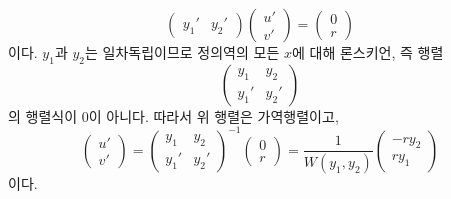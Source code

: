 \documentclass[../engineering_mathematics_lecture_note.tex]{subfiles}
\begin{document}
\begin{example}
\begin{equation*}
\begin{pmatrix}
            y_1' & y_2'
        \end{pmatrix}
        \begin{pmatrix}
            u' \\ v'
        \end{pmatrix}
        = \begin{pmatrix}
            0 \\ r
        \end{pmatrix}
    \end{equation*}
    이다.
    $y_1$과 $y_2$는 일차독립이므로 정의역의 모든 $x$에 대해 론스키언, 즉 행렬
    \begin{equation*}
        \begin{pmatrix}
            y_1 & y_2\\
            y_1' & y_2'
        \end{pmatrix}
    \end{equation*}
    의 행렬식이 0이 아니다.
    따라서 위 행렬은 가역행렬이고,
    \begin{equation*}
        \begin{pmatrix}
            u' \\ v'
        \end{pmatrix}
        =
        \begin{pmatrix}
            y_1 & y_2\\
            y_1' & y_2'
        \end{pmatrix}^{-1}
        \begin{pmatrix}
            0 \\ r
        \end{pmatrix}
        = \frac{1}{W(y_1, y_2)} \begin{pmatrix}
            -ry_2 \\ ry_1
        \end{pmatrix}
    \end{equation*}
    이다.
\end{example}
\end{document}
